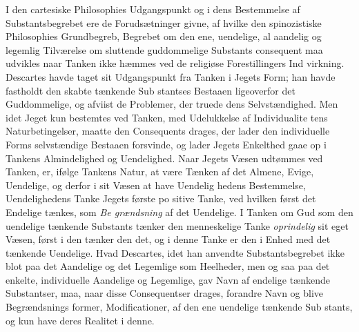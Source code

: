 \documentclass[12pt,a4paper]{book}
\begin{document}
I den cartesiske Philosophies Udgangspunkt og i dens
Bestemmelse af Substantsbegrebet ere de Forudsætninger givne,
af hvilke den spinozistiske Philosophies Grundbegreb, Begrebet
om den ene, uendelige, al aandelig og legemlig Tilværelse om\-%
sluttende guddommelige Substants consequent maa udvikles
naar Tanken ikke hæmmes ved de religiøse Forestillingers Ind\-%
virkning. Descartes havde taget sit Udgangspunkt fra Tanken
i Jegets Form; han havde fastholdt den skabte tænkende Sub\-%
stantses Bestaaen ligeoverfor det Guddommelige, og afviist de
Problemer, der truede dens Selvstændighed. Men idet Jeget
kun bestemtes ved Tanken, med Udelukkelse af Individualite\-%
tens Naturbetingelser, maatte den Consequents drages, der
lader den individuelle Forms selvstændige Bestaaen forsvinde,
og lader Jegets Enkelthed gaae op i Tankens Almindelighed
og Uendelighed. Naar Jegets Væsen udtømmes ved Tanken,
er, ifølge Tankens Natur, at være Tænken af det Almene,
Evige, Uendelige, og derfor i sit Væsen at have Uendelig\-%
hedens Bestemmelse, Uendelighedens Tanke Jegets første po\-%
sitive Tanke, ved hvilken først det Endelige tænkes, som \emph{Be\-%
grændsning} af det Uendelige. I Tanken om Gud som den
uendelige tænkende Substants tænker den menneskelige Tanke
\emph{oprindelig} sit eget Væsen, først i den tænker den det, og i
denne Tanke er den i Enhed med det tænkende Uendelige.
Hvad Descartes, idet han anvendte Substantsbegrebet ikke blot
paa det Aandelige og det Legemlige som Heelheder, men og\-%
saa paa det enkelte, individuelle Aandelige og Legemlige, gav
Navn af endelige tænkende Substantser, maa, naar disse
Consequentser drages, forandre Navn og blive Begrændsnings\-%
former, Modificationer, af den ene uendelige tænkende Sub\-%
stants, og kun have deres Realitet i denne.
\end{document}
